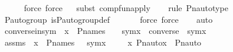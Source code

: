\begin{isabellebody}
\ \ \ \ \isamarkupfalse%
\ {\isacharparenleft}{\kern0pt}force{\isacharcomma}{\kern0pt}\ force{\isacharparenright}{\kern0pt}\isanewline
\ \ \isamarkupfalse%
{\isacharparenleft}{\kern0pt}subst\ comp{\isacharunderscore}{\kern0pt}fun{\isacharunderscore}{\kern0pt}apply{\isacharparenright}{\kern0pt}\ \isanewline
\ \ \isamarkupfalse%
{\isacharparenleft}{\kern0pt}rule\ Pn{\isacharunderscore}{\kern0pt}auto{\isacharunderscore}{\kern0pt}type{\isacharparenright}{\kern0pt}\isanewline
\ \ \isamarkupfalse%
\ {\isasymG}{\isacharunderscore}{\kern0pt}P{\isacharunderscore}{\kern0pt}auto{\isacharunderscore}{\kern0pt}group\ is{\isacharunderscore}{\kern0pt}P{\isacharunderscore}{\kern0pt}auto{\isacharunderscore}{\kern0pt}group{\isacharunderscore}{\kern0pt}def\ \isanewline
\ \ \ \ \isamarkupfalse%
\ {\isacharparenleft}{\kern0pt}force{\isacharcomma}{\kern0pt}\ force{\isacharparenright}{\kern0pt}\isanewline
\ \ \isamarkupfalse%
\ auto%
\endisatagproof
{\isafoldproof}%
%
\isadelimproof
\isanewline
%
\endisadelimproof
\isanewline
{}\isamarkupfalse%
\ converse{\isacharunderscore}{\kern0pt}in{\isacharunderscore}{\kern0pt}sym\ {\isacharcolon}{\kern0pt}\ {\isachardoublequoteopen}x\ {\isasymin}\ P{\isacharunderscore}{\kern0pt}names\ {\isasymLongrightarrow}\ {\isasympi}\ {\isasymin}\ sym{\isacharparenleft}{\kern0pt}x{\isacharparenright}{\kern0pt}\ {\isasymLongrightarrow}\ converse{\isacharparenleft}{\kern0pt}{\isasympi}{\isacharparenright}{\kern0pt}\ {\isasymin}\ sym{\isacharparenleft}{\kern0pt}x{\isacharparenright}{\kern0pt}{\isachardoublequoteclose}\ \isanewline
%
\isadelimproof
%
\endisadelimproof
%
\isatagproof
{}\isamarkupfalse%
\ {\isacharminus}{\kern0pt}\ \isanewline
\ \ \isamarkupfalse%
\ assms\ {\isacharcolon}{\kern0pt}\ {\isachardoublequoteopen}x\ {\isasymin}\ P{\isacharunderscore}{\kern0pt}names{\isachardoublequoteclose}\ {\isachardoublequoteopen}{\isasympi}\ {\isasymin}\ sym{\isacharparenleft}{\kern0pt}x{\isacharparenright}{\kern0pt}{\isachardoublequoteclose}\ \isanewline
\isanewline
\ \ \isamarkupfalse%
\ {\isachardoublequoteopen}{\isacharless}{\kern0pt}x{\isacharcomma}{\kern0pt}\ Pn{\isacharunderscore}{\kern0pt}auto{\isacharparenleft}{\kern0pt}{\isasympi}{\isacharparenright}{\kern0pt}{\isacharbackquote}{\kern0pt}x{\isachargreater}{\kern0pt}\ {\isasymin}\ Pn{\isacharunderscore}{\kern0pt}auto{\isacharparenleft}{\kern0pt}{\isasympi}{\isacharparenright}{\kern0pt}{\isachardoublequoteclose}\ \isanewline
\ \ \ \ \isamarkupfalse%

\end{isabellebody}
